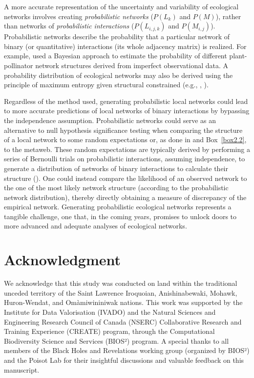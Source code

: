 A more accurate representation of the uncertainty and variability of ecological
networks involves creating \textit{probabilistic networks} ($P(L_k)$ and $P(M)$),
rather than networks of \textit{probabilistic interactions} ($P(L_{i, j, k})$ and
$P(M_{i, j})$). Probabilistic networks describe the probability that a
particular network of binary (or quantitative) interactions (its whole adjacency
matrix) is realized. For example, \textcite{Young2021Reconstruction} used a Bayesian
approach to estimate the probability of different plant-pollinator network
structures derived from imperfect observational data. A probability distribution
of ecological networks may also be derived using the principle of maximum
entropy given structural constrained (e.g., \cite{Cimini2019Statistical},
\cite{Park2004Statistical}). 

Regardless of the method used, generating probabilistic local networks could
lead to more accurate predictions of local networks of binary interactions by
bypassing the independence assumption. Probabilistic networks could serve as an
alternative to null hypothesis significance testing when comparing the structure
of a local network to some random expectations or, as done in
\textcite{Pellissier2018Comparing} and Box~\ref{box2.2}, to the metaweb. These random
expectations are typically derived by performing a series of Bernoulli trials on
probabilistic interactions, assuming independence, to generate a distribution of
networks of binary interactions to calculate their structure
(\cite{Poisot2016Structure}). One could instead compare the likelihood of an
observed network to the one of the most likely network structure (according to
the probabilistic network distribution), thereby directly obtaining a measure of
discrepancy of the empirical network. Generating probabilistic ecological
networks represents a tangible challenge, one that, in the coming years,
promises to unlock doors to more advanced and adequate analyses of ecological
networks.

\section{Acknowledgment} 

We acknowledge that this study was conducted on land within the traditional
unceded territory of the Saint Lawrence Iroquoian, Anishinabewaki, Mohawk,
Huron-Wendat, and Omàmiwininiwak nations. This work was supported by the
Institute for Data Valorisation (IVADO) and the Natural Sciences and Engineering
Research Council of Canada (NSERC) Collaborative Research and Training
Experience (CREATE) program, through the Computational Biodiversity Science and
Services (BIOS²) program. A special thanks to all members of the Black Holes and
Revelations working group (organized by BIOS²) and the Poisot Lab for their
insightful discussions and valuable feedback on this manuscript.

